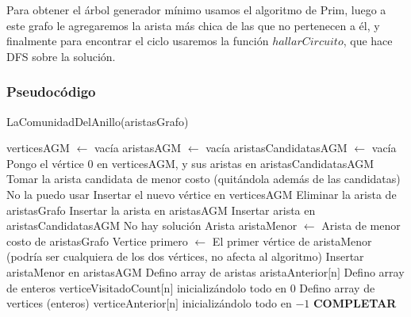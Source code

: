 Para obtener el árbol generador mínimo usamos el algoritmo de Prim, luego a este grafo le agregaremos la arista más chica de las que no pertenecen a él, y finalmente para encontrar el ciclo usaremos la función $hallarCircuito$, que hace DFS sobre la solución.

\subsubsection{Pseudocódigo}
\begin{algorithm}[H]
\begin{algorithmic}[1]
\caption{LaComunidadDelAnillo(aristasGrafo)}
\STATE verticesAGM $\leftarrow$ vacía
\STATE aristasAGM $\leftarrow$ vacía
\STATE aristasCandidatasAGM $\leftarrow$ vacía
\STATE Pongo el vértice 0 en verticesAGM, y sus aristas en aristasCandidatasAGM
	\STATE Tomar la arista candidata de menor costo (quitándola además de las candidatas)
        \STATE No la puedo usar
    \ELSE
        \STATE Insertar el nuevo vértice en verticesAGM
        \STATE Eliminar la arista de aristasGrafo
        \STATE Insertar la arista en aristasAGM
            \STATE Insertar arista en aristasCandidatasAGM
        \ENDFOR
    \ENDIF
\ENDWHILE
{}
    \STATE No hay solución
\ENDIF
\STATE Arista aristaMenor $\leftarrow$ Arista de menor costo de aristasGrafo
\STATE Vertice primero $\leftarrow$ El primer vértice de aristaMenor (podría ser cualquiera de los dos vértices, no afecta al algoritmo)
\STATE Insertar aristaMenor en aristasAGM
\STATE Defino array de aristas aristaAnterior$[$n$]$
\STATE Defino array de enteros verticeVisitadoCount$[$n$]$ inicializándolo todo en $0$
\STATE Defino array de vertices (enteros) verticeAnterior$[$n$]$ inicializándolo todo en $-1$
\STATE \textbf{COMPLETAR}
\end{algorithmic}
\end{algorithm}


